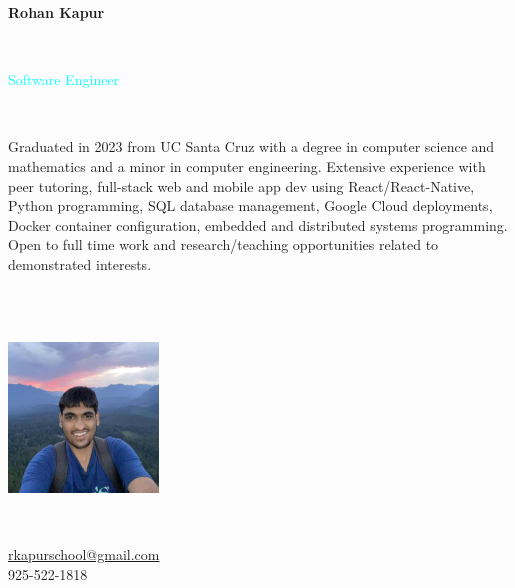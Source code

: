 \documentclass[letterpaper,10pt]{article}
\begin{document}
\fontsize{8.5pt}{\baselineskip}\selectfont

\begin{multicols}{3}
  \begin{huge} \noindent\textbf{Rohan Kapur} \end{huge} \\
  \begin{Large} \textcolor{cyan}{Software Engineer} \end{Large} 
  \vspace{.5em} \\
  \begin{minipage}{.4\textwidth}
    \begin{flushleft}
      Graduated in 2023 from UC Santa Cruz with a degree in computer science and mathematics and a minor in computer engineering. Extensive experience with peer tutoring, full-stack web and mobile app dev using React/React-Native, Python programming, SQL database management, Google Cloud deployments, Docker container configuration, embedded and distributed systems programming. Open to full time work and research/teaching opportunities related to demonstrated interests.
    \end{flushleft}
  \end{minipage}
  \columnbreak \\
  \vspace{4em} \\
  \begin{minipage}{.33\textwidth}
    \hspace{8em}
    \includegraphics*[width=4cm,height=4cm]{images/ProfilePicture.jpg}
  \end{minipage}
  \columnbreak \\
  \begin{flushright}
    \vspace{3em}
    \faEnvelope\hspace{4px}\href{mailto:rkapurschool@gmail.com}{rkapurschool@gmail.com} \\
    \vspace{1em}
    \faMobile*\hspace{4px}925-522-1818 \\

\end{flushright}
\end{multicols}
\end{document}
